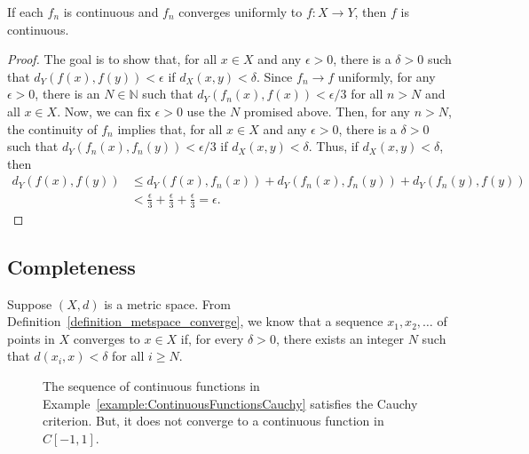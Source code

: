 \begin{theorem}
If each $f_n$ is continuous and $f_n$ converges uniformly to $f \colon X \to Y$, then $f$ is continuous.
\end{theorem}
\begin{proof}
The goal is to show that, for all $x\in X$ and any $\epsilon > 0$, there is a $\delta>0$ such that $d_Y (f (x),f (y)) < \epsilon$ if $d_X (x,y) < \delta$.
Since $f_n \to f$ uniformly, for any $\epsilon >0$, there is an $N\in \mathbb{N}$ such that $d_Y (f_n (x), f(x) ) < \epsilon / 3$ for all $n > N$ and all $x\in X$.
Now, we can fix $\epsilon > 0$ use the $N$ promised above.
Then, for any $n>N$, the continuity of $f_n$ implies that, for all $x\in X$ and any $\epsilon >0$, there is a $\delta>0$ such that $d_Y (f_n (x),f_n(y)) < \epsilon/3$ if $d_X (x,y) < \delta$.
Thus, if $d_X (x,y) < \delta$, then
\begin{align*}
d_Y (f(x),f(y))
&\leq d_Y (f(x),f_n (x)) + d_Y (f_n (x) ,f_n (y) ) + d_Y (f_n (y), f(y) ) \\
& < \frac{\epsilon}{3} + \frac{\epsilon}{3} + \frac{\epsilon}{3} = \epsilon.
\end{align*}
\end{proof}


\subsection{Completeness}
\label{sec:metspace_complete}
Suppose $(X,d)$ is a metric space.
From Definition~\ref{definition_metspace_converge}, we know that a sequence $x_1, x_2, \ldots$ of points in $X$ converges to $x \in X$ if, for every $\delta >0$, there exists an integer $N$ such that $d(x_i,x)<\delta$ for all $i \geq N$.

\begin{figure}[ht]
\begin{center}
\vspace{-8mm}
\end{center}
\caption{The sequence of continuous functions in Example~\ref{example:ContinuousFunctionsCauchy} satisfies the Cauchy criterion.
But, it does not converge to a continuous function in $C[-1,1]$.}
\end{figure}


